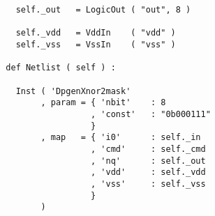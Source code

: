 \begin{itemize}
\begin{verbatim}
    self._out   = LogicOut ( "out", 8 )

    self._vdd   = VddIn    ( "vdd" )
    self._vss   = VssIn    ( "vss" )
    
  def Netlist ( self ) :
      
    Inst ( 'DpgenXnor2mask'
         , param = { 'nbit'    : 8
                   , 'const'   : "0b000111"
                   }
         , map   = { 'i0'      : self._in
                   , 'cmd'     : self._cmd
                   , 'nq'      : self._out
                   , 'vdd'     : self._vdd
                   , 'vss'     : self._vss
                   }
         )
\end{verbatim}
\end{itemize}
